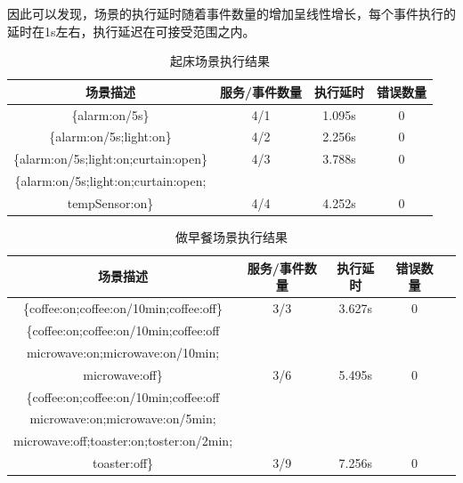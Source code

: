 \documentclass[winfonts,master,twoside]{njuthesis}
\begin{document}
 因此可以发现，场景的执行延时随着事件数量的增加呈线性增长，每个事件执行的延时在1s左右，执行延迟在可接受范围之内。
\begin{table}[!htbp]
	\centering
	\begin{tabular}{cccc}
		\toprule
		场景描述 & 服务/事件数量  & 执行延时 & 错误数量   \\
		\midrule
		\small\{alarm:on/5s\} & 4/1 & 1.095s & 0  \\
		\hline
	    \small\{alarm:on/5s;light:on\} & 4/2 & 2.256s & 0  \\
		\hline
		\small\{alarm:on/5s;light:on;curtain:open\} & 4/3 & 3.788s & 0  \\
		\hline
		\small\{alarm:on/5s;light:on;curtain:open;\\
		\small tempSensor:on\} & 4/4 & 4.252s & 0  \\
		\bottomrule
	\end{tabular}
	\caption{起床场景执行结果}
	\label{tbl:device_list}
\end{table}

\begin{table}[!htbp]
	\centering
	\begin{tabular}{ccccc}
		\toprule
		场景描述 & 服务/事件数量 & 执行延时 & 错误数量   \\
		\midrule
	    \small\{coffee:on;coffee:on/10min;coffee:off\} & 3/3 & 3.627s & 0  \\
		\hline
		\small\{coffee:on;coffee:on/10min;coffee:off\\
		\small microwave:on;microwave:on/10min;\\
		\small microwave:off\} & 3/6 & 5.495s & 0  \\
		\hline
		\small\{coffee:on;coffee:on/10min;coffee:off\\
		\small microwave:on;microwave:on/5min;\\
		\small microwave:off;toaster:on;toster:on/2min;\\
		\small toaster:off\} & 3/9 & 7.256s & 0  \\
	
		\bottomrule
	\end{tabular}
	\caption{做早餐场景执行结果}
	\label{tbl:device_list}
\end{table}
\end{document}
